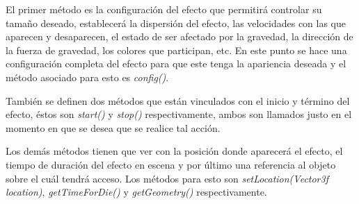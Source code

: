\documentclass[a4paper,12pt,openany,oneside]{book}
\begin{document}
El primer método es la configuración del efecto que permitirá controlar su tamaño deseado, establecerá la dispersión del efecto, las velocidades con las que aparecen y desaparecen, el estado de ser afectado por la gravedad, la dirección de la fuerza de gravedad, los colores que participan, etc. En este punto se hace una configuración completa del efecto para que este tenga la apariencia deseada y el método asociado para esto es \textit{config()}.

También se definen dos métodos que están vinculados con el inicio y término del efecto, éstos son \textit{start()} y \textit{stop()} respectivamente, ambos son llamados justo en el momento en que se desea que se realice tal acción.

Los demás métodos tienen que ver con la posición donde aparecerá el efecto, el tiempo de duración del efecto en escena y por último una referencia al objeto sobre el cuál tendrá acceso. Los métodos para esto son \textit{setLocation(Vector3f location)}, \textit{getTimeForDie()} y \textit{getGeometry()} respectivamente.
\end{document}
